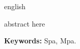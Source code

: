 \begin{resumo}[Abstract]
 \begin{otherlanguage*}{english}


abstract here

\textbf{Keywords: } Spa, Mpa.

\end{otherlanguage*}
\end{resumo}
